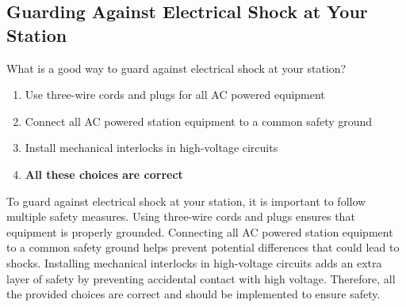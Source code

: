 \subsection{Guarding Against Electrical Shock at Your Station}
\label{T0A06}

\begin{tcolorbox}[colback=gray!10!white,colframe=black!75!black,title=T0A06]
What is a good way to guard against electrical shock at your station?
\begin{enumerate}[noitemsep]
    \item Use three-wire cords and plugs for all AC powered equipment
    \item Connect all AC powered station equipment to a common safety ground
    \item Install mechanical interlocks in high-voltage circuits
    \item \textbf{All these choices are correct}
\end{enumerate}
\end{tcolorbox}

To guard against electrical shock at your station, it is important to follow multiple safety measures. Using three-wire cords and plugs ensures that equipment is properly grounded. Connecting all AC powered station equipment to a common safety ground helps prevent potential differences that could lead to shocks. Installing mechanical interlocks in high-voltage circuits adds an extra layer of safety by preventing accidental contact with high voltage. Therefore, all the provided choices are correct and should be implemented to ensure safety.